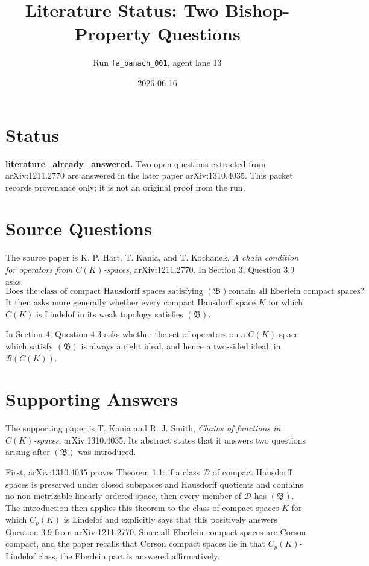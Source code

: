 \documentclass[11pt]{article}
\title{Literature Status: Two Bishop-Property Questions}
\author{Run \texttt{fa\_banach\_001}, agent lane 13}
\date{2026-06-16}
\newcommand{\bishop}{\mathfrak{B}}
\begin{document}
\maketitle

\section*{Status}

\textbf{literature\_already\_answered.}  Two open questions extracted from
arXiv:1211.2770 are answered in the later paper arXiv:1310.4035.  This
packet records provenance only; it is not an original proof from the run.

\section*{Source Questions}

The source paper is K. P. Hart, T. Kania, and T. Kochanek,
\emph{A chain condition for operators from \(C(K)\)-spaces},
arXiv:1211.2770.  In Section 3, Question 3.9 asks:
\[
\text{Does the class of compact Hausdorff spaces satisfying \((\bishop)\)
contain all Eberlein compact spaces?}
\]
It then asks more generally whether every compact Hausdorff space \(K\) for
which \(C(K)\) is Lindelof in its weak topology satisfies \((\bishop)\).

In Section 4, Question 4.3 asks whether the set of operators on a \(C(K)\)-space
which satisfy \((\bishop)\) is always a right ideal, and hence a two-sided ideal,
in \(\mathscr B(C(K))\).

\section*{Supporting Answers}

The supporting paper is T. Kania and R. J. Smith,
\emph{Chains of functions in \(C(K)\)-spaces}, arXiv:1310.4035.  Its abstract
states that it answers two questions arising after \((\bishop)\) was introduced.

First, arXiv:1310.4035 proves Theorem 1.1: if a class \(\mathscr D\) of compact
Hausdorff spaces is preserved under closed subspaces and Hausdorff quotients and
contains no non-metrizable linearly ordered space, then every member of
\(\mathscr D\) has \((\bishop)\).  The introduction then applies this theorem to
the class of compact spaces \(K\) for which \(C_p(K)\) is Lindelof and explicitly
says that this positively answers Question 3.9 from arXiv:1211.2770.  Since all
Eberlein compact spaces are Corson compact, and the paper recalls that Corson
compact spaces lie in that \(C_p(K)\)-Lindelof class, the Eberlein part is
answered affirmatively.
\end{document}
